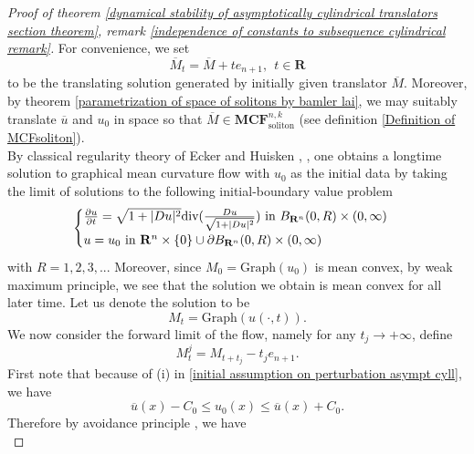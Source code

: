 \documentclass[pdflatex,sn-mathphys-num]{sn-jnl}%
\begin{document}
\begin{proof}[Proof of theorem \ref{dynamical stability of asymptotically cylindrical translators section theorem}, remark \ref{independence of constants to subsequence cylindrical remark}]
For convenience, we set 
\begin{equation}
    \overline{M}_t = \overline{M} + te_{n+1}, \ \ t\in \mathbf{R}
\end{equation}
to be the translating solution generated by initially given translator $\overline{M}$. Moreover, by theorem \ref{parametrization of space of solitons by bamler lai}, we may suitably translate $\overline{u}$ and $u_0$ in space so that $\overline{M} \in \textbf{MCF}^{n,k}_{\text{soliton}}$ (see definition \ref{Definition of MCFsoliton}).\\

By classical regularity theory of Ecker and Huisken \cite{eckerhuisken}, \cite{Ecker1991InteriorEF}, one obtains a longtime solution to graphical mean curvature flow with $u_0$ as the initial data by taking the limit of solutions to the following initial-boundary value problem
\begin{equation}
    \begin{cases}
    \frac{\partial u}{\partial t} = \sqrt{1 + |Du|^2}\textit{\emph{div}}(\frac{Du}{\sqrt{1 + |Du|^2}}) \text{ in }B_{\mathbf{R}^n}(0, R) \times (0, \infty) \\ u = u_0 \text{ in }\mathbf{R}^n\times \{0\} \cup \partial B_{\mathbf{R}^n}(0, R)\times (0, \infty)
    \end{cases}
\end{equation}
with $R = 1,2,3,..$. Moreover, since $M_0 = \text{Graph}(u_0)$ is mean convex, by weak maximum principle, we see that the solution we obtain is mean convex for all later time. Let us denote the solution to be 
\begin{equation}
    M_t = \text{Graph}(u(\cdot, t)).
\end{equation}
We now consider the forward limit of the flow, namely for any $t_j \to + \infty$, define
\begin{equation}
    M^j_t = M_{t + t_j} - t_je_{n+1}.
\end{equation}
First note that because of (i) in \eqref{initial assumption on perturbation asympt cyll}, we have
\begin{equation}
    \overline{u}(x) - C_0 \leq u_0(x) \leq \overline{u}(x) + C_0.
\end{equation}
Therefore by avoidance principle \cite{White2024TheAP}, we have
\begin{equation}

\end{equation}
\end{proof}
\end{document}
